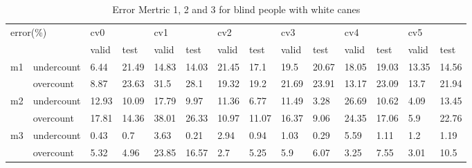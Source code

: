 \documentclass[11pt]{article}
\begin{document}
\begin{table}[]
\centering
\caption{Error Mertric 1, 2 and 3 for blind people with white canes}
\label{my-label}
\hspace*{-1.5cm}
\begin{tabular}{|l|l|l|l|l|l|l|l|l|l|l|l|l|l|}
\hline
\multicolumn{2}{|l|}{\multirow{2}{*}{error(\%)}} & \multicolumn{2}{l|}{cv0} & \multicolumn{2}{l|}{cv1} & \multicolumn{2}{l|}{cv2} & \multicolumn{2}{l|}{cv3} & \multicolumn{2}{l|}{cv4} & \multicolumn{2}{l|}{cv5} \\ \cline{3-14} 
\multicolumn{2}{|l|}{}                           & valid       & test       & valid       & test       & valid       & test       & valid       & test       & valid       & test       & valid       & test       \\ \hline
\multirow{2}{*}{m1}       & undercount      & 6.44        & 21.49      & 14.83       & 14.03      & 21.45       & 17.1       & 19.5        & 20.67      & 18.05       & 19.03      & 13.35       & 14.56      \\ \cline{2-14} 
                               & overcount       & 8.87        & 23.63      & 31.5        & 28.1       & 19.32       & 19.2       & 21.69       & 23.91      & 13.17       & 23.09      & 13.7        & 21.94      \\ \hline
\multirow{2}{*}{m2}       & undercount      & 12.93       & 10.09      & 17.79       & 9.97       & 11.36       & 6.77       & 11.49       & 3.28       & 26.69       & 10.62      & 4.09        & 13.45      \\ \cline{2-14} 
                               & overcount       & 17.81       & 14.36      & 38.01       & 26.33      & 10.97       & 11.07      & 16.37       & 9.06       & 24.35       & 17.06      & 5.9         & 22.76      \\ \hline
\multirow{2}{*}{m3}       & undercount      & 0.43        & 0.7        & 3.63        & 0.21       & 2.94        & 0.94       & 1.03        & 0.29       & 5.59        & 1.11       & 1.2         & 1.19       \\ \cline{2-14} 
                               & overcount       & 5.32        & 4.96       & 23.85       & 16.57      & 2.7         & 5.25       & 5.9         & 6.07       & 3.25        & 7.55       & 3.01        & 10.5       \\ \hline
\end{tabular}
\end{table}


\nocite{*}




\end{document}
